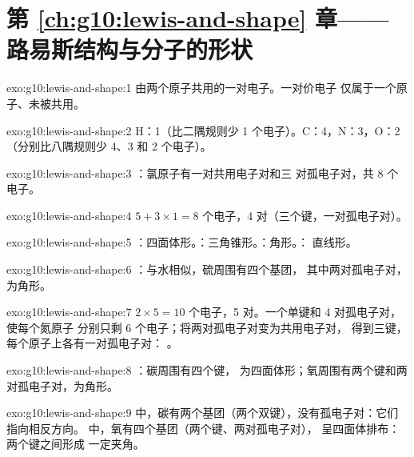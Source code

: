 \section*{第 \ref{ch:g10:lewis-and-shape} 章——路易斯结构与分子的形状}

\begin{solution}{exo:g10:lewis-and-shape:1}
由两个原子共用的一对电子。一对价电子
仅属于一个原子、未被共用。
\end{solution}

\begin{solution}{exo:g10:lewis-and-shape:2}
H：1（比二隅规则少 1 个电子）。C：4，N：3，O：2（分别比八隅规则少
4、3 和 2 个电子）。
\end{solution}

\begin{solution}{exo:g10:lewis-and-shape:3}
：氯原子有一对共用电子对和三
对孤电子对，共 8 个电子。
\end{solution}

\begin{solution}{exo:g10:lewis-and-shape:4}
$5 + 3 \times 1 = 8$ 个电子，4 对（三个键，一对孤电子对）。
\end{solution}

\begin{solution}{exo:g10:lewis-and-shape:5}
：四面体形。：三角锥形。：角形。：
直线形。
\end{solution}

\begin{solution}{exo:g10:lewis-and-shape:6}
：与水相似，硫周围有四个基团，
其中两对孤电子对，为角形。
\end{solution}

\begin{solution}{exo:g10:lewis-and-shape:7}
$2 \times 5 = 10$ 个电子，5 对。一个单键和 4 对孤电子对，使每个氮原子
分别只剩 6 个电子；将两对孤电子对变为共用电子对，
得到三键，每个原子上各有一对孤电子对：
。
\end{solution}

\begin{solution}{exo:g10:lewis-and-shape:8}
：碳周围有四个键，
为四面体形；氧周围有两个键和两对孤电子对，为角形。
\end{solution}

\begin{solution}{exo:g10:lewis-and-shape:9}
 中，碳有两个基团（两个双键），没有孤电子对：它们
指向相反方向。 中，氧有四个基团（两个键、两对孤电子对），
呈四面体排布：两个键之间形成
一定夹角。
\end{solution}

